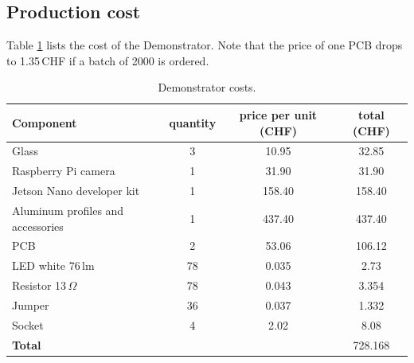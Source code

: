 \newpage
\subsection{Production cost}
Table \ref{development:cost} lists the cost of the Demonstrator.
Note that the price of one PCB drops to 1.35\,CHF if a batch of 2000 is ordered.
\begin{table}[ht]
	\centering
	\begin{tabular}{|l|c|c|c|}
		\hline
		Component & quantity & price per unit (CHF)& total (CHF)\\
		\hline
		Glass & 3 & 10.95 & 32.85\\
		\hline
		Raspberry Pi camera&1&31.90&31.90\\
		\hline
		Jetson Nano developer kit&1&158.40&158.40\\
		\hline	
		Aluminum profiles and accessories&1&437.40&437.40\\
		\hline
		PCB&2&53.06&106.12\\
		\hline
		LED white 76\,lm&78&0.035&2.73\\
		\hline
		Resistor 13\,$\Omega$&78&0.043&3.354\\
		\hline
		Jumper&36&0.037&1.332\\
		\hline
		Socket&4&2.02&8.08\\
		\hline
		\hline
		\textbf{Total}&&&728.168\\
		\hline
	\end{tabular}
	\caption{Demonstrator costs.\label{development:cost}}
\end{table}